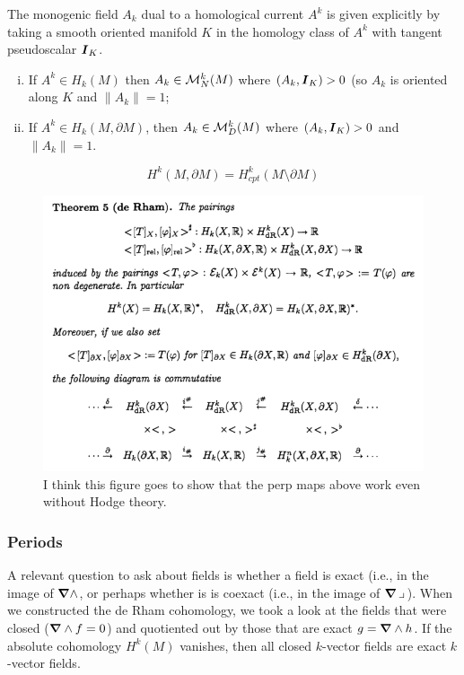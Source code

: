 \documentclass{article}
\begin{document}
The monogenic field $A_k$ dual to a homological current $A^k$ is given explicitly by taking a smooth oriented manifold $K$ in the homology class of $A^k$ with tangent pseudoscalar $\boldsymbol{I}_K$.
\begin{enumerate}[i.]
    \item If $A^k \in H_k(M)$ then $A_k\in \mathcal{M}^k_N(M)$ where $(A_k,\boldsymbol{I}_K)>0$ (so $A_k$ is oriented along $K$ and $\|A_k\|=1$;
    \item If $A^k \in H_k(M,\partial M)$, then $A_k \in \mathcal{M}^k_D(M)$ where $(A_k,\boldsymbol{I}_K)>0$ and $\|A_k\|=1$.
\end{enumerate}

\begin{theorem}
\[
H^k(M,\partial M) = H^k_{cpt}(M\setminus \partial M)
\]
\end{theorem}

\begin{figure}
    \centering
    \includegraphics[width=.8\textwidth]{figures/de_rham_theorem.png}
    \caption{I think this figure goes to show that the perp maps above work even without Hodge theory.}
\end{figure}




\subsubsection{Periods}

A relevant question to ask about fields is whether a field is exact (i.e., in the image of $\boldsymbol{\nabla} \wedge$, or perhaps whether is is coexact (i.e., in the image of $\boldsymbol{\nabla} \hspace*{.5mm}\lrcorner \hspace*{.5mm}$). When we constructed the de Rham cohomology, we took a look at the fields that were closed ($\boldsymbol{\nabla} \wedge f = 0$) and quotiented out by those that are exact $g = \boldsymbol{\nabla} \wedge h$. If the absolute cohomology $H^k(M)$ vanishes, then all closed $k$-vector fields are exact $k$-vector fields. 
\end{document}
